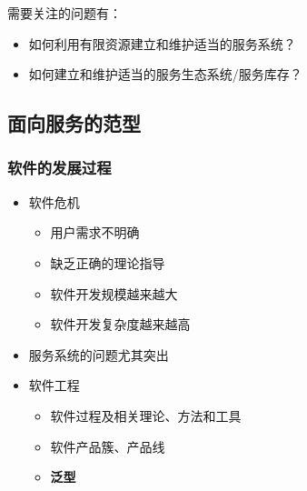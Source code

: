 需要关注的问题有：
\vspace{-0.8em}
\begin{multicols}{2}
    \begin{itemize}[leftmargin=1em]
        \item 如何利用有限资源建立和维护适当的服务系统？
        \item 如何建立和维护适当的服务生态系统/服务库存？
    \end{itemize}   
\end{multicols}
\vspace{-1em}


\subsection{面向服务的范型}

\subsubsection{软件的发展过程}
\begin{itemize}
    \item 软件危机
    \vspace{-0.8em}
    \begin{multicols}{2}
    \begin{itemize}
        \item 用户需求不明确 
        \item 缺乏正确的理论指导
        \item 软件开发规模越来越大
        \item 软件开发复杂度越来越高 
    \end{itemize}  
    \end{multicols}
    \vspace{-1em}
    \item 服务系统的问题尤其突出
    \item 软件工程
    \vspace{-0.8em}
    \begin{multicols}{2}
    \begin{itemize}
        \item 软件过程及相关理论、方法和工具
        \item 软件产品簇、产品线
        \item \textbf{泛型}
    \end{itemize}  
    \end{multicols}
    \vspace{-1em}
\end{itemize}

